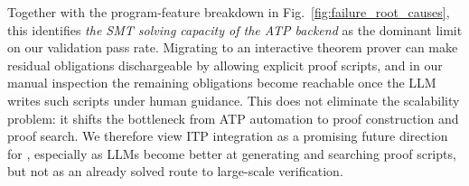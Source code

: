 Together with the program-feature breakdown in
Fig.~\ref{fig:failure_root_causes}, this identifies \emph{the SMT solving capacity of
the ATP backend} as the dominant limit on our validation pass rate. Migrating to an interactive theorem prover can make residual obligations dischargeable by allowing explicit proof scripts, and in our manual inspection the remaining obligations become reachable once the LLM writes such scripts under human guidance. This does not eliminate the scalability problem: it shifts the bottleneck from ATP automation to proof construction and proof search. We therefore view ITP integration as a promising future direction for \toolname, especially as LLMs become better at generating and searching proof scripts, but not as an already solved route to large-scale verification.
